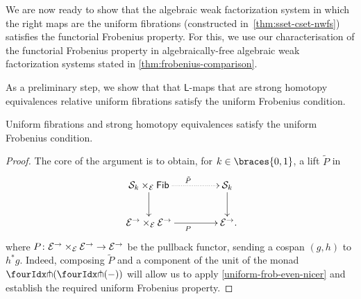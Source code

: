 \documentclass[reqno,10pt,a4paper,oneside,draft]{amsart}
\newcommand{\LL}{\mathsf{L}}
\begin{document}
{{We are now ready to show that the algebraic weak factorization system in which the right maps are the uniform fibrations (constructed in~\cref{thm:sset-cset-nwfs}) satisfies the functorial Frobenius property.
For this, we use our characterisation of the functorial Frobenius property in algebraically-free algebraic weak factorization systems
stated in \cref{thm:frobenius-comparison}.

As a preliminary step, we show that that $\LL$-maps that are strong homotopy equivalences relative uniform fibrations satisfy the uniform Frobenius condition.






\begin{lemma} \label{technical}
Uniform fibrations and strong homotopy equivalences satisfy the uniform Frobenius condition.
\end{lemma}




\begin{proof} The core of the argument is to obtain, for $k \in \braces{0, 1}$, a lift $\tilde{P}$ in 
\begin{equation} \label{strong-h-equiv-uniform-base-change:goal}
\begin{gathered}
\xymatrix@C+2em{
  \cal{S}_k \times_{\cal{E}} \Fib
  \ar@{.>}[r]^{\tilde{P}}
  \ar[d]
&
  \cal{S}_k
  \ar[d]
\\
  \cal{E}^\to \times_{\cal{E}} \cal{E}^\to
  \ar[r]_{P}
&
  \cal{E}^\to
\rlap{.}}
\end{gathered}
\end{equation}
where $P \colon \mathcal{E}^\to \times_{\mathcal{E}} \mathcal{E}^\to \to \mathcal{E}^\to$ be the pullback functor, sending a cospan $(g, h)$ to $h^* g$. Indeed,
composing $\tilde{P}$ and a component of the unit of the monad $\liftl{(\liftr{(-)})}$ will allow us to apply \cref{uniform-frob-even-nicer} and
establish the required uniform Frobenius property. 


\end{proof}}}
\end{document}
